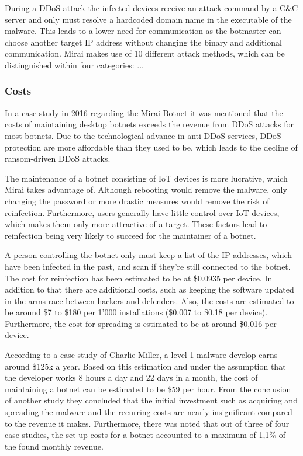 During a DDoS attack the infected devices receive an attack command by a C\&C server and only must resolve a hardcoded domain name in the executable of the malware. This leads to a lower need for communication as the botmaster can choose another target IP address without changing the binary and additional communication.
Mirai makes use of 10 different attack methods, which can be distinguished within four categories: ...

	\subsubsection{Costs}
	In a case study in 2016 regarding the Mirai Botnet it was mentioned that the costs of maintaining desktop botnets exceeds the revenue from DDoS attacks for most botnets. Due to the technological advance in anti-DDoS services, DDoS protection are more affordable than they used to be, which leads to the decline of ransom-driven DDoS attacks.
	
The maintenance of a botnet consisting of IoT devices is more lucrative, which Mirai takes advantage of. Although rebooting would remove the malware, only changing the password or more drastic measures would remove the risk of reinfection. Furthermore, users generally have little control over IoT devices, which makes them only more attractive of a target. These factors lead to reinfection being very likely to succeed for the maintainer of a botnet.

A person controlling the botnet only must keep a list of the IP addresses, which have been infected in the past, and scan if they're still connected to the botnet. The cost for reinfection has been estimated to be at \$0.0935 per device. In addition to that there are additional costs, such as keeping the software updated in the arms race between hackers and defenders.
Also, the costs are estimated to be around \$7 to \$180 per 1'000 installations (\$0.007 to \$0.18 per device). Furthermore, the cost for spreading is estimated to be at around \$0,016 per device.

According to a case study of Charlie Miller, a level 1 malware develop earns around \$125k a year. Based on this estimation and under the assumption that the developer works 8 hours a day and 22 days in a month, the cost of maintaining a botnet can be estimated to be \$59 per hour.
From the conclusion of another study they concluded that the initial investment such as acquiring and spreading the malware and the recurring costs are nearly insignificant compared to the revenue it makes. Furthermore, there was noted that out of three of four case studies, the set-up costs for a botnet accounted to a maximum of 1,1\% of the found monthly revenue.

